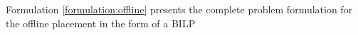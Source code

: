 
Formulation \ref{formulation:offline} presents the complete problem formulation for the offline placement in the form of a BILP



